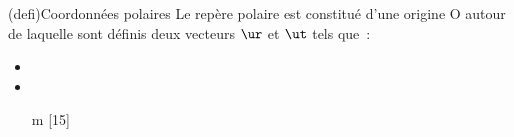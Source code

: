 \documentclass[../../main/main.tex]{subfiles}
\begin{document}
\begin{tcb*}[sidebyside, righthand ratio=.37](defi){Coordonnées polaires}
	Le repère polaire est constitué d'une origine O autour de laquelle sont
	définis deux vecteurs $\ur$ et $\ut$ tels que~:
	\begin{itemize}
		\item {}
		\item {}
		\item[m][15] \psw{%
			      \[
				      \boxed{\OM(t) = r(t)\ur}
				      \qet
				      \boxed{\norm{\OM}(t) = r(t)}
			      \]
		      }%
		      \vspace{-15pt}
	\end{itemize}
	\begin{center}
	\end{center}
	\tcblower
	\begin{center}
		\vspace{-15pt}
	\end{center}
\end{tcb*}
\end{document}

